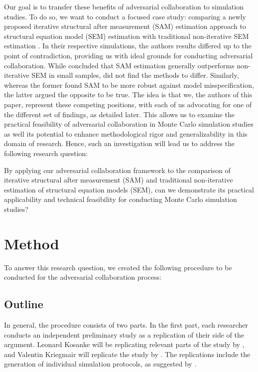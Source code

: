 \documentclass[man]{apa7}
\begin{document}
Our goal is to transfer these benefits of adversarial collaboration to simulation studies. To do so, we want to conduct a focused case study: comparing a newly proposed iterative structural after measurement (SAM) estimation approach to structural equation model (SEM) estimation with traditional non-iterative SEM estimation \parencite{dhaene_evaluation_2023, robitzsch_comparing_2022, rosseel_structural_2022}. In their respective simulations, the authors results differed up to the point of contradiction, providing us with ideal grounds for conducting adversarial collaboration. While \textcite{dhaene_evaluation_2023} concluded that SAM estimation generally outperforms non-iterative SEM in small samples, \textcite{robitzsch_comparing_2022} did not find the methods to differ. Similarly, whereas the former found SAM to be more robust against model misspecification, the latter argued the opposite to be true. The idea is that we, the authors of this paper, represent these competing positions, with each of us advocating for one of the different set of findings, as detailed later. This allows us to examine the practical feasibility of adversarial collaboration in Monte Carlo simulation studies as well its potential to enhance methodological rigor and generalizability in this domain of research. Hence, such an investigation will lead us to address the following research question:

By applying our adversarial collaboration framework to the comparison of iterative structural after measurement (SAM) and traditional non-iterative estimation of structural equation models (SEM), can we demonstrate its practical applicability and technical feasibility for conducting Monte Carlo simulation studies?

\section{Method}
To answer this research question, we created the following procedure to be conducted for the adversarial collaboration process:

\subsection{Outline}
In general, the procedure consists of two parts. In the first part, each researcher conducts an independent preliminary study as a replication of their side of the argument. Leonard Kosanke will be replicating relevant parts of the study by \textcite{robitzsch_comparing_2022}, and Valentin Kriegmair will replicate the study by \textcite{dhaene_evaluation_2023}. The replications include the generation of individual simulation protocols, as suggested by \textcite{morris_using_2019}.
\end{document}
